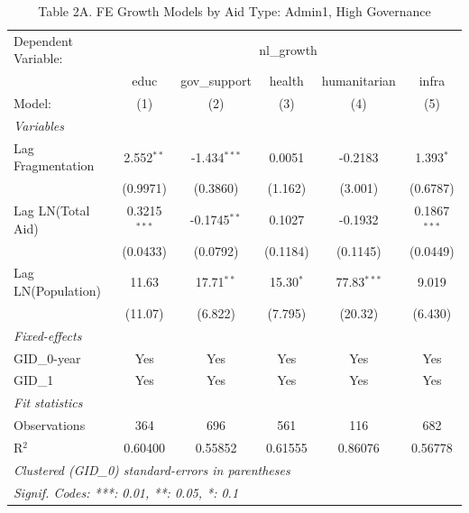 \begin{table}[htbp]
   \caption{Table 2A. FE Growth Models by Aid Type: Admin1, High Governance}
   \centering
   \begin{tabular}{lccccc}
      \tabularnewline \midrule \midrule
      Dependent Variable: & \multicolumn{5}{c}{nl\_growth}\\
                         & educ           & gov\_support   & health      & humanitarian  & infra \\   
      Model:             & (1)            & (2)            & (3)         & (4)           & (5)\\  
      \midrule
      \emph{Variables}\\
      Lag Fragmentation  & 2.552$^{**}$   & -1.434$^{***}$ & 0.0051      & -0.2183       & 1.393$^{*}$\\   
                         & (0.9971)       & (0.3860)       & (1.162)     & (3.001)       & (0.6787)\\   
      Lag LN(Total Aid)  & 0.3215$^{***}$ & -0.1745$^{**}$ & 0.1027      & -0.1932       & 0.1867$^{***}$\\   
                         & (0.0433)       & (0.0792)       & (0.1184)    & (0.1145)      & (0.0449)\\   
      Lag LN(Population) & 11.63          & 17.71$^{**}$   & 15.30$^{*}$ & 77.83$^{***}$ & 9.019\\   
                         & (11.07)        & (6.822)        & (7.795)     & (20.32)       & (6.430)\\   
      \midrule
      \emph{Fixed-effects}\\
      GID\_0-year        & Yes            & Yes            & Yes         & Yes           & Yes\\  
      GID\_1             & Yes            & Yes            & Yes         & Yes           & Yes\\  
      \midrule
      \emph{Fit statistics}\\
      Observations       & 364            & 696            & 561         & 116           & 682\\  
      R$^2$              & 0.60400        & 0.55852        & 0.61555     & 0.86076       & 0.56778\\  
      \midrule \midrule
      \multicolumn{6}{l}{\emph{Clustered (GID\_0) standard-errors in parentheses}}\\
      \multicolumn{6}{l}{\emph{Signif. Codes: ***: 0.01, **: 0.05, *: 0.1}}\\
   \end{tabular}
\end{table}



